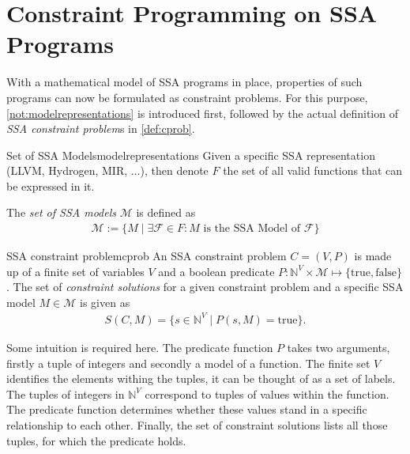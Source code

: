 \section{Constraint Programming on SSA Programs}

    With a mathematical model of SSA programs in place, properties of such
    programs can now be formulated as constraint problems.
    For this purpose, \autoref{not:modelrepresentations} is introduced first,
    followed by the actual definition of {\em SSA constraint problem}s in
    \autoref{def:cprob}.

\begin{notation}{Set of SSA Models}{modelrepresentations}
    Given a specific SSA representation (LLVM, Hydrogen, MIR, $\dots$), then
    denote $F$ the set of all valid functions that can be expressed in it.

    The {\em set of SSA models} $\mathcal M$ is defined as
    \begin{align*}
        \mathcal M := \{M\mid\exists\mathcal F\in F\colon M
                        \text{ is the SSA Model of }\mathcal F\}
    \end{align*}
\end{notation}

\begin{definition}{SSA constraint problem}{cprob}
    An SSA constraint problem $C=(V,P)$ is made up of a finite set of variables
    $V$ and a boolean predicate
    $P\colon\mathbb N^V\times\mathcal M\mapsto\{\text{true}, \text{false}\}$.
    The set of {\em constraint solutions} for a given constraint problem and a
    specific SSA model $M\in\mathcal M$ is given as
    \begin{align*}
        S(C,M) = \{s\in\mathbb N^V\mid P(s,M)=\text{true}\}.
    \end{align*}
\end{definition}

    Some intuition is required here.
    The predicate function $P$ takes two arguments, firstly a tuple of integers
    and secondly a model of a function.
    The finite set $V$ identifies the elements withing the tuples, it can be
    thought of as a set of labels.
    The tuples of integers in $\mathbb N^V$ correspond to tuples of values
    within the function.
    The predicate function determines whether these values stand in a specific
    relationship to each other.
    Finally, the set of constraint solutions lists all those tuples, for which
    the predicate holds.


